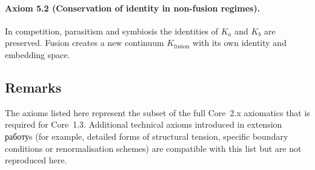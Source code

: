 \paragraph{Axiom 5.2 (Conservation of identity in non-fusion regimes).}
In competition, parasitism and symbiosis the identities of \(K_a\) and \(K_b\)
are preserved.  Fusion creates a new continuum \(K_{\mathrm{fusion}}\) with its
own identity and embedding space.

\subsection{Remarks}

The axioms listed here represent the subset of the full Core~2.x axiomatics
that is required for Core~1.3.  Additional technical axioms introduced in
extension работуs (for example, detailed forms of structural tension, specific
boundary conditions or renormalisation schemes) are compatible with this list
but are not reproduced here.
